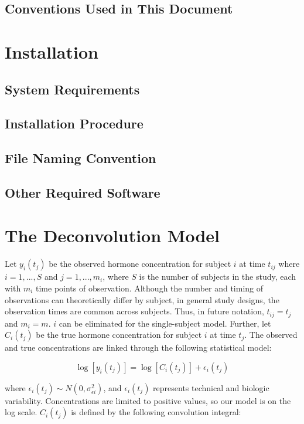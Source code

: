 \documentclass[11pt]{book}
\begin{document}
\section{Conventions Used in This Document}

\chapter{Installation}
\section{System Requirements}
\section{Installation Procedure}
\section{File Naming Convention}
\section{Other Required Software}
\chapter{The Deconvolution Model}
Let $y_i(t_{j})$ be the observed hormone concentration for subject $i$ at time $t_{ij}$ where $i = 1,...,S$ and $j=1,...,m_i$, where $S$ is the number of subjects in the study, each with $m_i$ time points of observation. Although the number and timing of observations can theoretically differ by subject, in general study designs, the observation times are common across subjects. Thus, in future notation, $t_{ij} = t_j$ and $m_i = m$. $i$ can be eliminated for the single-subject model.
Further, let $C_i(t_j)$ be the true hormone concentration for subject $i$ at time $t_j$. The observed and true concentrations are linked through the following statistical model:


$$
\log[y_i(t_j)]=\log[C_i(t_j)]+\epsilon_i(t_j)
$$


\noindent where $\epsilon_i(t_j) \sim N(0,\sigma^2_{\epsilon i})$, and $\epsilon_i(t_j)$ represents technical and biologic variability. Concentrations are limited to positive values, so our model is on the log scale. $C_i(t_j)$ is defined by the following convolution integral:
\end{document}
